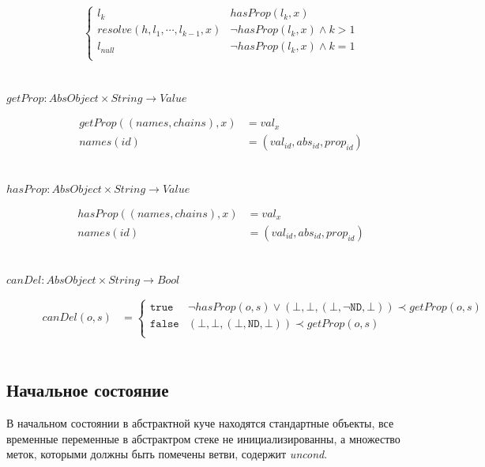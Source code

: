 \begin{description}
\[\begin{aligned}
\begin{cases}
      l_k & hasProp(l_k, x) \\
      resolve(h, l_1, \cdots, l_{k-1}, x) & \lnot hasProp(l_k, x)
      \land k > 1 \\
      l_{null} & \lnot hasProp(l_k, x)
      \land k = 1 \\
    \end{cases} \\ 
  \end{aligned}
  \]
  \\
  \item[ $getProp : AbsObject \times String \rightarrow Value$ ] %
  \[
  \begin{aligned}
    getProp((names, chains), x) &= val_{x}  \\
    names(id) &= (val_{id}, abs_{id}, prop_{id}) \\
  \end{aligned}
  \]
  \\
  \item[ $hasProp : AbsObject \times String \rightarrow Value$ ] %
  \[
  \begin{aligned}
    hasProp((names, chains), x) &= val_{x}  \\
    names(id) &= (val_{id}, abs_{id}, prop_{id}) \\
  \end{aligned}
  \]
  \\
  \item[ $canDel : AbsObject \times String \rightarrow Bool$ ] %
  \[
  \begin{aligned}
  canDel(o, s) &= 
  \begin{cases}
    \mathtt{true} & \lnot hasProp(o, s) \lor (\bot, \bot, (\bot,
      \lnot \mathtt{ND}, \bot)) \prec getProp(o, s) \\
    \mathtt{false} & 
      (\bot, \bot, (\bot, \mathtt{ND}, \bot)) \prec getProp(o, s) \\ 
  \end{cases}
  \end{aligned}
  \]
  \\
\end{description}
\subsection{Начальное состояние}%
\label{sec:init}
В начальном состоянии в абстрактной куче находятся стандартные
объекты, все временные переменные в абстрактром стеке не
инициализированны, а множество меток, которыми должны быть помечены
ветви, содержит \emph{uncond}.


